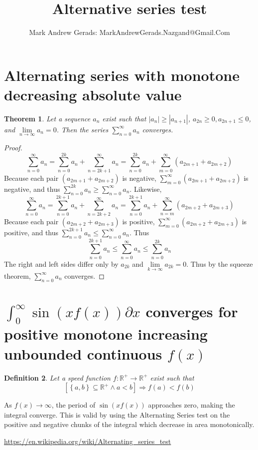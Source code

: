 \documentclass[]{article}
\author{Mark Andrew Gerads: MarkAndrewGerads.Nazgand@Gmail.Com}
\title{Alternative series test}
\newcommand{\pqty}[1]{{\left(#1\right)}}
\newcommand{\Bqty}[1]{{\left\{#1\right\}}}
\newcommand{\bqty}[1]{{\left[#1\right]}}
\newcommand{\abs}[1]{{\left\lvert#1\right\rvert}}
\newtheorem{theorem}{Theorem}[section]
\newtheorem{definition}[theorem]{Definition}
\numberwithin{equation}{section}
\begin{document}
	
	\maketitle
	\section{Alternating series with monotone decreasing absolute value}
	
	\begin{theorem}
		Let a sequence \(a_n\) exist such that \(\abs{a_n}\geq\abs{a_{n+1}}\), \(a_{2n}\geq 0,a_{2n+1}\leq 0\), and \(\lim\limits_{n\to\infty}a_n=0\). Then the series \(\sum_{n=0}^{\infty}a_n\) converges.
	\end{theorem}
	\begin{proof}
		\begin{equation}
			\sum_{n=0}^{\infty}a_n
			=
			\sum_{n=0}^{2k}a_n+\sum_{n=2k+1}^{\infty}a_n
			=
			\sum_{n=0}^{2k}a_n+\sum_{m=0}^{\infty}\pqty{a_{2m+1}+a_{2m+2}}
		\end{equation}
		Because each pair \(\pqty{a_{2m+1}+a_{2m+2}}\) is negative, \(\sum_{m=0}^{\infty}\pqty{a_{2m+1}+a_{2m+2}}\) is negative, and thus \(\sum_{n=0}^{2k}a_n\geq \sum_{n=0}^{\infty}a_n\). Likewise,
		\begin{equation}
		\sum_{n=0}^{\infty}a_n
		=
		\sum_{n=0}^{2k+1}a_n+\sum_{n=2k+2}^{\infty}a_n
		=
		\sum_{n=0}^{2k+1}a_n+\sum_{n=m}^{\infty}\pqty{a_{2m+2}+a_{2m+3}}
		\end{equation}
		Because each pair \(\pqty{a_{2m+2}+a_{2m+3}}\) is positive, \(\sum_{m=0}^{\infty}\pqty{a_{2m+2}+a_{2m+3}}\) is positive, and thus \(\sum_{n=0}^{2k+1}a_n\leq \sum_{n=0}^{\infty}a_n\). Thus
		\begin{equation}
			\sum_{n=0}^{2k+1}a_n\leq
			\sum_{n=0}^{\infty}a_n\leq
			\sum_{n=0}^{2k}a_n
		\end{equation}
		The right and left sides differ only by \(a_{2k}\) and \(\lim\limits_{k\to\infty}a_{2k}=0\). Thus by the squeeze theorem, \(\sum_{n=0}^{\infty}a_n\) converges.
	\end{proof}
	
	\section{\(\int_{0}^{\infty}\sin\pqty{xf\pqty{x}}\partial x\) converges for positive monotone increasing unbounded continuous \(f\pqty{x}\)}
	\begin{definition}
		Let a speed function \(f:\mathbb{R}^+\to\mathbb{R}^+\) exist such that
		\begin{equation}
		\bqty{\Bqty{a,b}\subseteq\mathbb{R}^+\land a<b}
		\Rightarrow
		f\pqty{a}<f\pqty{b}
		\end{equation}
	\end{definition}

	As \(f\pqty{x}\to\infty\), the period of \(\sin\pqty{xf\pqty{x}}\) approaches zero, making the integral converge. This is valid by using the Alternating Series test on the positive and negative chunks of the integral which decrease in area monotonically.
	
	\url{https://en.wikipedia.org/wiki/Alternating_series_test}
	
\end{document}
